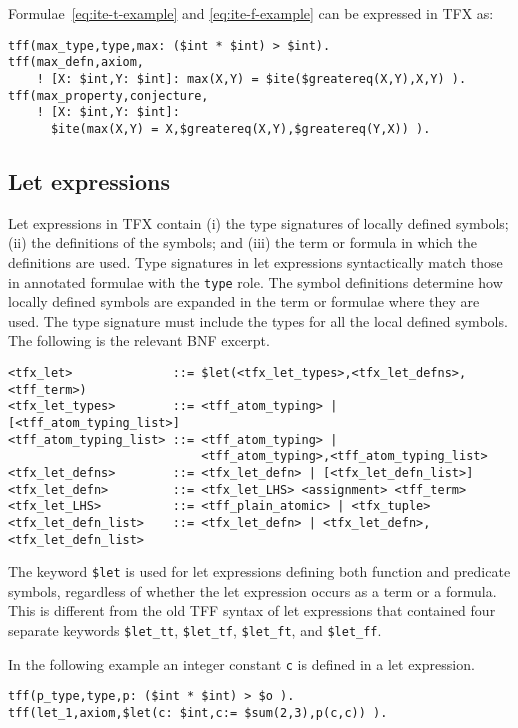 \documentclass{easychair}
\begin{document}
Formulae~\ref{eq:ite-t-example} and \ref{eq:ite-f-example} can be expressed in
TFX as:
\begin{verbatim}
tff(max_type,type,max: ($int * $int) > $int).
tff(max_defn,axiom,
    ! [X: $int,Y: $int]: max(X,Y) = $ite($greatereq(X,Y),X,Y) ).
tff(max_property,conjecture,
    ! [X: $int,Y: $int]: 
      $ite(max(X,Y) = X,$greatereq(X,Y),$greatereq(Y,X)) ).
\end{verbatim}

\subsection{Let expressions}

Let expressions in TFX contain (i) the type signatures of locally defined 
symbols; (ii) the definitions of the symbols; and (iii) the term or formula
in which the definitions are used. 
Type signatures in let expressions syntactically match those in annotated 
formulae with the \verb'type' role. 
The symbol definitions determine how locally defined symbols are expanded 
in the term or formulae where they are used.
The type signature must include the types for all the local defined symbols.
The following is the relevant BNF excerpt.
\begin{verbatim}
<tfx_let>              ::= $let(<tfx_let_types>,<tfx_let_defns>,<tff_term>)
<tfx_let_types>        ::= <tff_atom_typing> | [<tff_atom_typing_list>]
<tff_atom_typing_list> ::= <tff_atom_typing> |
                           <tff_atom_typing>,<tff_atom_typing_list>
<tfx_let_defns>        ::= <tfx_let_defn> | [<tfx_let_defn_list>]
<tfx_let_defn>         ::= <tfx_let_LHS> <assignment> <tff_term>
<tfx_let_LHS>          ::= <tff_plain_atomic> | <tfx_tuple>
<tfx_let_defn_list>    ::= <tfx_let_defn> | <tfx_let_defn>,<tfx_let_defn_list>
\end{verbatim}
The keyword \verb'$let' is used for let expressions defining both function and 
predicate symbols, regardless of whether the let expression occurs as a term 
or a formula. 
This is different from the old TFF syntax of let expressions that contained 
four separate keywords \verb'$let_tt', \verb'$let_tf', \verb'$let_ft', and 
\verb'$let_ff'.

In the following example an integer constant {\tt c} is defined in a let expression.
\begin{verbatim}
tff(p_type,type,p: ($int * $int) > $o ).
tff(let_1,axiom,$let(c: $int,c:= $sum(2,3),p(c,c)) ).
\end{verbatim}
\end{document}
